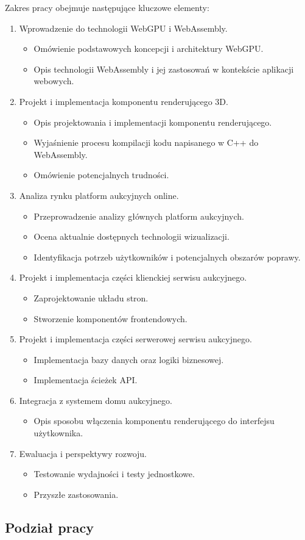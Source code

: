 Zakres pracy obejmuje następujące kluczowe elementy:
\begin{enumerate}
  \item Wprowadzenie do technologii WebGPU i WebAssembly.
    \begin{itemize}
      \item Omówienie podstawowych koncepcji i architektury WebGPU.
      \item Opis technologii WebAssembly i jej zastosowań w kontekście aplikacji webowych.
    \end{itemize}
  \item Projekt i implementacja komponentu renderującego 3D.
  \begin{itemize}
    \item Opis projektowania i implementacji komponentu renderującego.
    \item Wyjaśnienie procesu kompilacji kodu napisanego w C++ do WebAssembly.
    \item Omówienie potencjalnych trudności.
  \end{itemize}
  \item Analiza rynku platform aukcyjnych online.
    \begin{itemize}
      \item Przeprowadzenie analizy głównych platform aukcyjnych.
      \item Ocena aktualnie dostępnych technologii wizualizacji.
      \item Identyfikacja potrzeb użytkowników i potencjalnych obszarów poprawy.
    \end{itemize}
  \item Projekt i implementacja części klienckiej serwisu aukcyjnego.
    \begin{itemize}
      \item Zaprojektowanie układu stron.
      \item Stworzenie komponentów frontendowych.
    \end{itemize}
  \item Projekt i implementacja części serwerowej serwisu aukcyjnego.
    \begin{itemize}
      \item Implementacja bazy danych oraz logiki biznesowej.
      \item Implementacja ścieżek API.
    \end{itemize}
  \item Integracja z systemem domu aukcyjnego.
    \begin{itemize}
      \item Opis sposobu włączenia komponentu renderującego do interfejsu użytkownika.
    \end{itemize}
  \item Ewaluacja i perspektywy rozwoju.
    \begin{itemize}
      \item Testowanie wydajności i testy jednostkowe.
      \item Przyszłe zastosowania.
    \end{itemize}
\end{enumerate}

\newpage

\subsection{Podział pracy}

\newpage